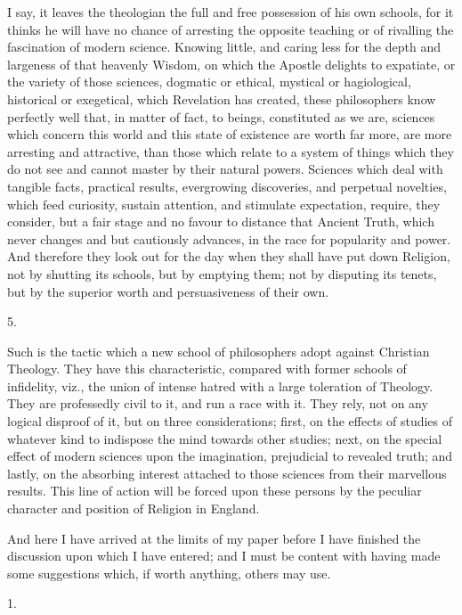 I say, it leaves the theologian the full and free possession of his
own schools, for it thinks he will have no chance of arresting the
opposite teaching or of rivalling the fascination of modern science.
Knowing little, and caring less for the depth and largeness of that
heavenly Wisdom, on which the Apostle delights to expatiate, or the
variety of those sciences, dogmatic or ethical, mystical or
hagiological, historical or exegetical, which Revelation has created,
these philosophers know perfectly well that, in matter of fact, to
beings, constituted as we are, sciences which concern this world and
this state of existence are worth far more, are more arresting and
attractive, than those which relate to a system of things which they
do not see and cannot master by their natural powers. Sciences which
deal with tangible facts, practical results, evergrowing discoveries,
and perpetual novelties, which feed curiosity, sustain attention, and
stimulate expectation, require, they consider, but a fair stage and no
favour to distance that Ancient Truth, which never changes and but
cautiously advances, in the race for popularity and power. And
therefore they look out for the day when they shall have put down
Religion, not by shutting its schools, but by emptying them; not by
disputing its tenets, but by the superior worth and persuasiveness of
their own.

5.

Such is the tactic which a new school of philosophers adopt against
Christian Theology. They have this characteristic, compared with
former schools of infidelity, viz., the union of intense hatred with a
large toleration of Theology. They are professedly civil to it, and
run a race with it. They rely, not on any logical disproof of it, but
on three considerations; first, on the effects of studies of whatever
kind to indispose the mind towards other studies; next, on the special
effect of modern sciences upon the imagination, prejudicial to
revealed truth; and lastly, on the absorbing interest attached to
those sciences from their marvellous results. This line of action will
be forced upon these persons by the peculiar character and position of
Religion in England.

And here I have arrived at the limits of my paper before I have
finished the discussion upon which I have entered; and I must be
content with having made some suggestions which, if worth anything,
others may use.


1.

